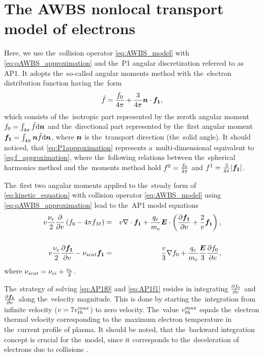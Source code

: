 \section{The AWBS nonlocal transport model of electrons}
\label{sec:C7cod}

Here, we use the~collision operator \eqref{eq:AWBS_model} with 
\eqref{eq:qAWBS_approximation} and the~P1 angular discretization 
referred to as AP1. It adopts the~so-called angular 
moments method with the~electron distribution function having the~form
\begin{equation}
  \tilde{f} = \frac{f_0}{4\pi} + \frac{3}{4\pi}\boldsymbol{n}\cdot\boldsymbol{f_1} , 
  \label{eq:P1approximation}
\end{equation}
which consists of the~isotropic part represented by the zeroth angular moment 
$f_0 = \int_{4\pi} \tilde{f} \text{d}\boldsymbol{n}$ 
and the~directional part represented by the~first angular moment 
$\boldsymbol{f_1} = \int_{4\pi} \boldsymbol{n}
\tilde{f} \text{d}\boldsymbol{n}$, where $\boldsymbol{n}$ is the~transport direction (the~solid angle).
It should noticed, that \eqref{eq:P1approximation} represents 
a~multi-dimensional equivalent to \eqref{eq:f_approximation}, where 
the~following relations between the~spherical harmonics method
and the~moments method hold $f^0 = \frac{f_0}{4\pi}$ and 
$f^1 = \frac{3}{4\pi}|\boldsymbol{f_1}|$.

The~first two angular moments applied to the~steady form of 
\eqref{eq:kinetic_equation} with collision operator \eqref{eq:AWBS_model} 
using \eqref{eq:qAWBS_approximation} lead to the~AP1 model equations
\begin{eqnarray}
  v\frac{\nu_{e}}{2}\frac{\partial{}}{\partial{v}}\left(f_0 - 4\pi f_M \right) &=&
  v\nabla\cdot\boldsymbol{f_1} + \frac{q_e}{m_e}\boldsymbol{E}\cdot\left(
  \frac{\partial{\boldsymbol{f_1}}}{\partial{v}} + \frac{2}{v}\boldsymbol{f_1}\right) , 
  \nonumber \\
  \label{eq:AP1f0}\\
  v\frac{\nu_{e}}{2}\frac{\partial{\boldsymbol{f_1}}}{\partial{v}}
  - \nu_{scat}\boldsymbol{f_1} &=& 
  \frac{v}{3}\nabla f_0 + 
  \frac{q_e}{m_e}\frac{\boldsymbol{E}}{3}\frac{\partial{f_0}}{\partial{v}} ,
  \label{eq:AP1f1}
\end{eqnarray}
where $\nu_{scat} = \nu_{ei} + \frac{\nu_{e}}{2}$. 

The~strategy of solving 
\eqref{eq:AP1f0} and \eqref{eq:AP1f1} resides in integrating 
$\frac{\partial{f_0}}{\partial{v}}$
and $\frac{\partial{\boldsymbol{f_1}}}{\partial{v}}$ along the~velocity magnitude. 
This is done by starting the~integration
from infinite velocity ($v = 7 v_{th}^{max}$) to zero velocity. The~value
$v_{th}^{max}$ equals the~electron thermal velocity corresponding to the~maximum 
electron temperature in the~current profile of plasma.
It should be noted, that the~backward integration concept is crucial for 
the~model, since it corresponds to the~deceleration of electrons due to 
collisions \cite{Touati_2014}. 

